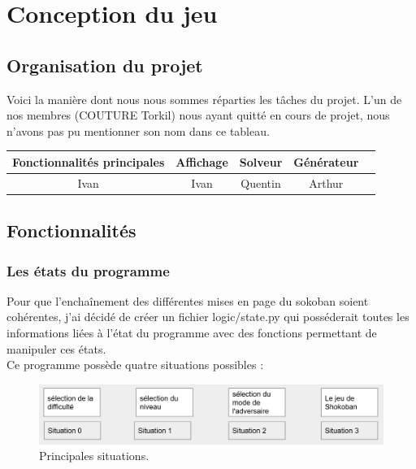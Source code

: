 \documentclass[a4paper,12pt]{article}
\begin{document}
\newpage

\section{Conception du jeu}
\subsection{Organisation du projet}

Voici la manière dont nous nous sommes réparties les tâches du projet. L'un de nos membres (COUTURE Torkil) nous ayant quitté en cours de projet, nous n'avons pas pu mentionner son nom dans ce tableau.\\
\begin{center}
\begin{tabular}{|c|c|c|c|c|}\hline
Fonctionnalités principales&Affichage&Solveur&Générateur\\ \hline\hline
Ivan&      Ivan&      Quentin&      Arthur   \\\hline
\end{tabular}
\end{center}

\subsection{Fonctionnalités}

\subsubsection{Les états du programme}

Pour que l’enchaînement des différentes mises en page du sokoban soient cohérentes, j'ai décidé de créer un fichier logic/state.py qui posséderait toutes les informations liées à l'état du programme avec des fonctions permettant de manipuler ces états.\\

Ce programme possède quatre situations possibles :

\begin{figure}[H]
\includegraphics[width=\linewidth]{./Illustrations/state_1.png}
\caption{Principales situations.}
\end{figure}
\end{document}
